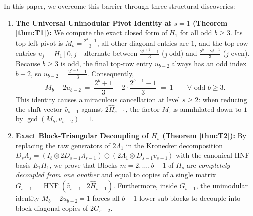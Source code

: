 \documentclass[11pt,a4paper]{article}
\theoremstyle{plain}
\theoremstyle{definition}
\newcommand{\HNF}{\operatorname{HNF}}
\begin{document}
In this paper, we overcome this barrier through three structural discoveries:

\begin{enumerate}[label=\textbf{(\arabic*)},leftmargin=2.2em]
\item \textbf{The Universal Unimodular Pivot Identity at $s=1$ (Theorem \ref{thm:T1}):}
We compute the exact closed form of $H_1$ for all odd $b \ge 3$. Its top-left pivot is $M_b = \frac{2^b+1}{3}$, all other diagonal entries are $1$, and the top row entries $u_j = H_1[0,j]$ alternate between $\frac{2^{j+1}-1}{3}$ ($j$ odd) and $\frac{2^b - 2^{j+1}}{3}$ ($j$ even). Because $b \ge 3$ is odd, the final top-row entry $u_{b-2}$ always has an odd index $b-2$, so $u_{b-2} = \frac{2^{b-1}-1}{3}$. Consequently,
\[
M_b - 2 u_{b-2} \;=\; \frac{2^b + 1}{3} - 2 \cdot \frac{2^{b-1} - 1}{3} \;=\; 1 \qquad \forall \text{ odd } b \ge 3.
\]
This identity causes a miraculous cancellation at level $s \ge 2$: when reducing the shift vector $\hat{v}_{s-1}$ against $2\hat{H}_{s-1}$, the factor $M_b$ is annihilated down to $1$ by $\gcd(M_b, u_{b-2}) = 1$.

\item \textbf{Exact Block-Triangular Decoupling of $H_s$ (Theorem \ref{thm:T2}):}
By replacing the raw generators of $2\Lambda_1$ in the Kronecker decomposition $D_s\Lambda_s = (I_b \otimes 2 D_{s-1}\Lambda_{s-1}) \oplus (2\Lambda_1 \otimes D_{s-1} v_{s-1})$ with the canonical HNF basis $E_1 H_1$, we prove that Blocks $m = 2,\dots,b-1$ of $H_s$ are \emph{completely decoupled from one another} and equal to copies of a single matrix $G_{s-1} = \HNF(\hat{v}_{s-1} \mid 2\hat{H}_{s-1})$. Furthermore, inside $G_{s-1}$, the unimodular identity $M_b - 2 u_{b-2} = 1$ forces all $b-1$ lower sub-blocks to decouple into block-diagonal copies of $2 G_{s-2}$.


\end{enumerate}
\end{document}
